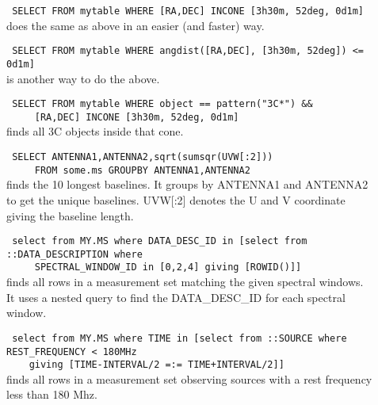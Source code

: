 \begin{description}
  \item[] \texttt{ SELECT FROM mytable WHERE
      [RA,DEC] INCONE [3h30m, 52deg, 0d1m] }
    \\does the same as above in an easier (and faster) way.

  \item[] \texttt{ SELECT FROM mytable WHERE
      angdist([RA,DEC], [3h30m, 52deg]) <= 0d1m] }
    \\is another way to do the above.

  \item[] \texttt{ SELECT FROM mytable WHERE object == pattern("3C*") \&\&}
     \\\verb=    =
     \texttt{ [RA,DEC] INCONE [3h30m, 52deg, 0d1m] }
     \\finds all 3C objects inside that cone.

   \item[] \texttt{ SELECT ANTENNA1,ANTENNA2,sqrt(sumsqr(UVW[:2]))}
     \\\verb=    =
     \texttt{ FROM some.ms GROUPBY ANTENNA1,ANTENNA2 }
     \\finds the 10 longest baselines. It groups by ANTENNA1 and
     ANTENNA2 to get the unique baselines. UVW[:2] denotes the U and V
     coordinate giving the baseline length.

  \item[] \texttt{ select from MY.MS where DATA\_DESC\_ID in
      [select from ::DATA\_DESCRIPTION where}
    \\\verb=    =
    \texttt{      SPECTRAL\_WINDOW\_ID in [0,2,4] giving [ROWID()]]}
    \\finds all rows in a measurement set matching the given
    spectral windows. It uses a nested query to find the
    DATA\_DESC\_ID for each spectral window.

  \item[] \texttt{ select from MY.MS where TIME in
      [select from ::SOURCE where REST\_FREQUENCY < 180MHz}
    \\\verb=    =
    \texttt{giving [TIME-INTERVAL/2 =:= TIME+INTERVAL/2]]}
    \\finds all rows in a measurement set observing sources with a
    rest frequency less than 180 Mhz.


\end{description}
